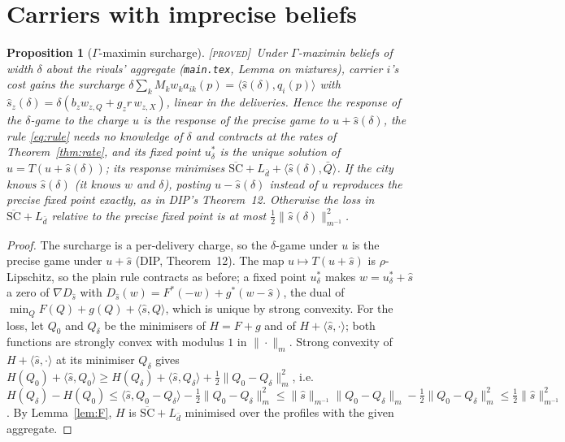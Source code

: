 \documentclass[11pt]{article}
\newtheorem{proposition}[theorem]{Proposition}
\theoremstyle{definition}
\theoremstyle{remark}
\newcommand{\ip}[2]{\langle #1,#2\rangle}
\newcommand{\Qbar}{\bar Q}
\newcommand{\dbar}{\bar d}
\newcommand{\SCbar}{\overline{\mathrm{SC}}}
\newcommand{\norm}[2]{\|#1\|_{#2}}
\newcommand{\PROVED}{{\normalfont\textsc{[proved]}}}
\begin{document}
\section{Carriers with imprecise beliefs}\label{sec:credal}

\begin{proposition}[$\Gamma$-maximin surcharge]\label{prop:gamma}\PROVED\
Under $\Gamma$-maximin beliefs of width $\delta$ about the rivals' aggregate (\texttt{main.tex}, Lemma on mixtures), carrier $i$'s cost gains the surcharge $\delta\sum_kM_kw_ka_{ik}(p)=\ip{\hat s(\delta)}{q_i(p)}$ with $\hat s_z(\delta)=\delta(b_zw_{z,Q}+g_zr\,w_{z,X})$, linear in the deliveries. Hence the response of the $\delta$-game to the charge $u$ is the response of the precise game to $u+\hat s(\delta)$, the rule \eqref{eq:rule} needs no knowledge of $\delta$ and contracts at the rates of Theorem~\ref{thm:rate}, and its fixed point $u^*_\delta$ is the unique solution of $u=T(u+\hat s(\delta))$; its response minimises $\SCbar+L_{\dbar}+\ip{\hat s(\delta)}{\Qbar}$. If the city knows $\hat s(\delta)$ (it knows $w$ and $\delta$), posting $u-\hat s(\delta)$ instead of $u$ reproduces the precise fixed point exactly, as in DIP's Theorem~12. Otherwise the loss in $\SCbar+L_{\dbar}$ relative to the precise fixed point is at most $\tfrac12\norm{\hat s(\delta)}{m^{-1}}^2$.
\end{proposition}
\begin{proof}
The surcharge is a per-delivery charge, so the $\delta$-game under $u$ is the precise game under $u+\hat s$ (DIP, Theorem~12). The map $u\mapsto T(u+\hat s)$ is $\rho$-Lipschitz, so the plain rule contracts as before; a fixed point $u^*_\delta$ makes $w=u^*_\delta+\hat s$ a zero of $\nabla D_{\hat s}$ with $D_{\hat s}(w)=F^*(-w)+g^*(w-\hat s)$, the dual of $\min_Q F(Q)+g(Q)+\ip{\hat s}{Q}$, which is unique by strong convexity. For the loss, let $Q_0$ and $Q_\delta$ be the minimisers of $H=F+g$ and of $H+\ip{\hat s}{\cdot}$; both functions are strongly convex with modulus $1$ in $\norm\cdot m$. Strong convexity of $H+\ip{\hat s}\cdot$ at its minimiser $Q_\delta$ gives $H(Q_0)+\ip{\hat s}{Q_0}\ge H(Q_\delta)+\ip{\hat s}{Q_\delta}+\tfrac12\norm{Q_0-Q_\delta}m^2$, i.e.\ $H(Q_\delta)-H(Q_0)\le\ip{\hat s}{Q_0-Q_\delta}-\tfrac12\norm{Q_0-Q_\delta}m^2\le\norm{\hat s}{m^{-1}}\norm{Q_0-Q_\delta}m-\tfrac12\norm{Q_0-Q_\delta}m^2\le\tfrac12\norm{\hat s}{m^{-1}}^2$. By Lemma~\ref{lem:F}, $H$ is $\SCbar+L_{\dbar}$ minimised over the profiles with the given aggregate.
\end{proof}
\end{document}
